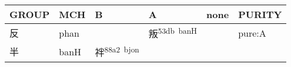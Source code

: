 \documentclass[14pt,a4paper]{scrartcl}
\begin{document}
\begin{longtable}[c]{@{}llllll@{}}
\toprule
\begin{minipage}[b]{0.14\columnwidth}\raggedright\strut
GROUP
\strut\end{minipage} &
\begin{minipage}[b]{0.14\columnwidth}\raggedright\strut
MCH
\strut\end{minipage} &
\begin{minipage}[b]{0.14\columnwidth}\raggedright\strut
B
\strut\end{minipage} &
\begin{minipage}[b]{0.14\columnwidth}\raggedright\strut
A
\strut\end{minipage} &
\begin{minipage}[b]{0.14\columnwidth}\raggedright\strut
none
\strut\end{minipage} &
\begin{minipage}[b]{0.14\columnwidth}\raggedright\strut
PURITY
\strut\end{minipage}\tabularnewline
\midrule
\endhead
\begin{minipage}[t]{0.14\columnwidth}\raggedright\strut
反
\strut\end{minipage} &
\begin{minipage}[t]{0.14\columnwidth}\raggedright\strut
phan
\strut\end{minipage} &
\begin{minipage}[t]{0.14\columnwidth}\raggedright\strut
\strut\end{minipage} &
\begin{minipage}[t]{0.14\columnwidth}\raggedright\strut
叛\textsuperscript{53db~banH}
\strut\end{minipage} &
\begin{minipage}[t]{0.14\columnwidth}\raggedright\strut
\strut\end{minipage} &
\begin{minipage}[t]{0.14\columnwidth}\raggedright\strut
pure:A
\strut\end{minipage}\tabularnewline
\begin{minipage}[t]{0.14\columnwidth}\raggedright\strut
半
\strut\end{minipage} &
\begin{minipage}[t]{0.14\columnwidth}\raggedright\strut
banH
\strut\end{minipage} &
\begin{minipage}[t]{0.14\columnwidth}\raggedright\strut
袢\textsuperscript{88a2~bjon}
\strut\end{minipage} &

\end{longtable}
\end{document}
